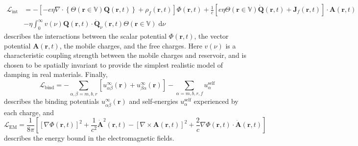 \documentclass{article}
\begin{document}
\begin{equation}
\begin{split}
\mathcal{L}_\mathrm{int} &= -\left[-e\eta\nabla\cdot\left\{\Theta(\mathbf{r}\in\mathbb{V})\mathbf{Q}(\mathbf{r},t)\right\} + \rho_f(\mathbf{r},t)\right]\Phi(\mathbf{r},t) + \frac{1}{c}\left[e\eta\Theta(\mathbf{r}\in\mathbb{V})\dot{\mathbf{Q}}(\mathbf{r},t) + \mathbf{J}_f(\mathbf{r},t)\right]\cdot\mathbf{A}(\mathbf{r},t)\\
&- \eta\int_0^\infty  v(\nu)\mathbf{Q}(\mathbf{r},t)\cdot\dot{\mathbf{Q}}_\nu(\mathbf{r},t)\Theta(\mathbf{r}\in\mathbb{V})\;\mathrm{d}\nu
\end{split}
\end{equation}
describes the interactions between the scalar potential $\Phi(\mathbf{r},t)$, the vector potential $\mathbf{A}(\mathbf{r},t)$, the mobile charges, and the free charges. Here $ v(\nu)$ is a characteristic coupling strength between the mobile charges and reservoir, and is chosen to be spatially invariant to provide the simplest realistic model of damping in real materials. Finally,
\begin{equation}
\mathcal{L}_\mathrm{bind} = -\sum_{\alpha,\beta = m,b,r}\left[u_{\alpha\beta}^\infty(\mathbf{r}) + u_{\beta\alpha}^\infty(\mathbf{r})\right] - \sum_{\alpha = m,b,r,f}u_\alpha^\mathrm{self}
\end{equation}
describes the binding potentials $u_{\alpha\beta}^\infty(\mathbf{r})$ and self-energies $u_\alpha^\mathrm{self}$ experienced by each charge, and
\begin{equation}
\mathcal{L}_\mathrm{EM} = \frac{1}{8\pi}\left[\left[\nabla\Phi(\mathbf{r},t)\right]^2 + \frac{1}{c^2}\dot{\mathbf{A}}^2(\mathbf{r},t) - \left[\nabla\times\mathbf{A}(\mathbf{r},t)\right]^2 + \frac{2}{c}\nabla\Phi(\mathbf{r},t)\cdot\dot{\mathbf{A}}(\mathbf{r},t)\right]
\end{equation}
describes the energy bound in the electromagnetic fields. 

\end{document}
